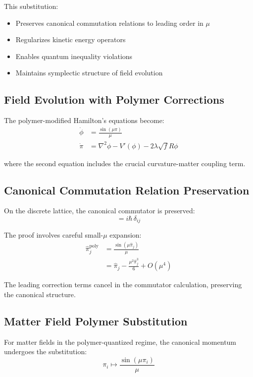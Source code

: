 \documentclass[11pt]{article}
\begin{document}
This substitution:
\begin{itemize}
\item Preserves canonical commutation relations to leading order in $\mu$
\item Regularizes kinetic energy operators
\item Enables quantum inequality violations
\item Maintains symplectic structure of field evolution
\end{itemize}

\subsection{Field Evolution with Polymer Corrections}

The polymer-modified Hamilton's equations become:
\begin{align}
\dot{\phi} &= \frac{\sin(\mu \pi)}{\mu} \\
\dot{\pi} &= \nabla^2\phi - V'(\phi) - 2\lambda\sqrt{f}R\phi
\end{align}

where the second equation includes the crucial curvature-matter coupling term.

\subsection{Canonical Commutation Relation Preservation}

On the discrete lattice, the canonical commutator is preserved:
\begin{equation}
[\hat{\phi}_i, \hat{\pi}_j^{\text{poly}}] = i\hbar\,\delta_{ij}
\end{equation}

The proof involves careful small-$\mu$ expansion:
\begin{align}
\hat{\pi}_j^{\text{poly}} &= \frac{\sin(\mu\hat{\pi}_j)}{\mu} \\
&= \hat{\pi}_j - \frac{\mu^2\hat{\pi}_j^3}{6} + O(\mu^4)
\end{align}

The leading correction terms cancel in the commutator calculation, preserving the canonical structure.

\subsection{Matter Field Polymer Substitution}

For matter fields in the polymer-quantized regime, the canonical momentum undergoes the substitution:
\begin{equation}
\pi_i \mapsto \frac{\sin(\mu \pi_i)}{\mu}
\end{equation}
\end{document}
